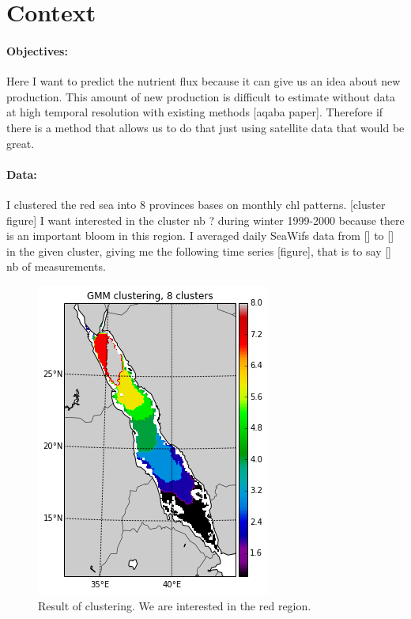 \documentclass{article}
\begin{document}
  \section{Context}

  \paragraph{Objectives:}

  Here I want to predict the nutrient flux because it can give us an idea about new production. This amount of new production is difficult to estimate without data at high temporal resolution with existing methods [aqaba paper]. Therefore if there is a method that allows us to do that just using satellite data that would be great.

  \paragraph{Data:}

  I clustered the red sea into 8 provinces bases on monthly chl patterns. [cluster figure] I want interested in the cluster nb ? during winter 1999-2000 because there is an important bloom in this region. I averaged daily SeaWifs data from [] to [] in the given cluster, giving me the following time series [figure], that is to say [] nb of measurements.  


  \begin{figure}[ht]
  \centering
    \includegraphics[scale=.3]{./clusters.png}
  \caption{Result of clustering. We are interested in the red region.}
  \end{figure}
\end{document}
